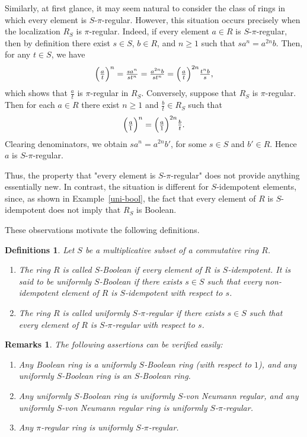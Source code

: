\documentclass[12pt]{article}
\newtheorem{defns}[thm]{\bf Definitions}
\newtheorem{rems}[thm]{\bf Remarks}
\begin{document}
Similarly, at first glance, it may seem natural to consider the class of rings in which every element is $S$-$\pi$-regular. However, this situation occurs precisely when the localization $R_S$ is $\pi$-regular.  Indeed, if every element \(a \in R\) is \(S\)-\(\pi\)-regular, then by definition there exist \(s \in S\), \(b \in R\), and \(n \geq 1\) such that 
$sa^n = a^{2n}b$. Then, for any \(t \in S\), we have 
\[
\Bigl(\tfrac{a}{t}\Bigr)^n 
= \tfrac{sa^n}{st^n} 
= \tfrac{a^{2n}b}{st^n} 
= \Bigl(\tfrac{a}{t}\Bigr)^{2n} \tfrac{t^n b}{s},
\]
which shows that \(\tfrac{a}{t}\) is \(\pi\)-regular in \(R_S\). Conversely, suppose that \(R_S\) is \(\pi\)-regular. Then for each \(a \in R\) there exist \(n \geq 1\) and \(\tfrac{b}{t} \in R_S\) such that 
\[
\Bigl(\tfrac{a}{1}\Bigr)^n = \Bigl(\tfrac{a}{1}\Bigr)^{2n}\tfrac{b}{t}.
\] 
Clearing denominators, we obtain $sa^n = a^{2n}b'$, for some \(s \in S\) and \(b' \in R\). Hence \(a\) is \(S\)-\(\pi\)-regular.

Thus, the property that "every element is \(S\)-\(\pi\)-regular" does not provide anything essentially new. In contrast, the situation is different for \(S\)-idempotent elements, since, as shown in Example~\ref{uni-bool}, the fact that every element of \(R\) is \(S\)-idempotent does not imply that \(R_S\) is Boolean.  

These observations motivate the following definitions.

\begin{defns}\label{section-3-defns}
Let \(S\) be a multiplicative subset of a commutative ring \(R\). 
\begin{enumerate}
\item The ring \(R\) is called \emph{\(S\)-Boolean} if every element of \(R\) is \(S\)-idempotent. It is said to be \emph{uniformly \(S\)-Boolean} if there exists \(s \in S\) such that every non-idempotent element of \(R\) is \(S\)-idempotent with respect to \(s\).  

\item The ring \(R\) is called \emph{uniformly \(S\)-\(\pi\)-regular} if there exists \(s \in S\) such that every  element of \(R\) is \(S\)-\(\pi\)-regular with respect to \(s\).  
\end{enumerate}
\end{defns}


\begin{rems}\label{rems-on-defn} 
The following assertions can be verified easily:
\begin{enumerate}

\item Any Boolean ring is a uniformly \( S \)-Boolean ring (with respect to \(1\)), and any uniformly \( S \)-Boolean ring is an \( S \)-Boolean ring.
 
\item Any uniformly \( S \)-Boolean ring is uniformly \( S \)-von Neumann regular, and any uniformly \( S \)-von Neumann regular ring is uniformly \( S \)-\( \pi \)-regular.
 
\item Any \( \pi \)-regular ring is uniformly \( S \)-\( \pi \)-regular.
\end{enumerate}
\end{rems}
 
\end{document}
